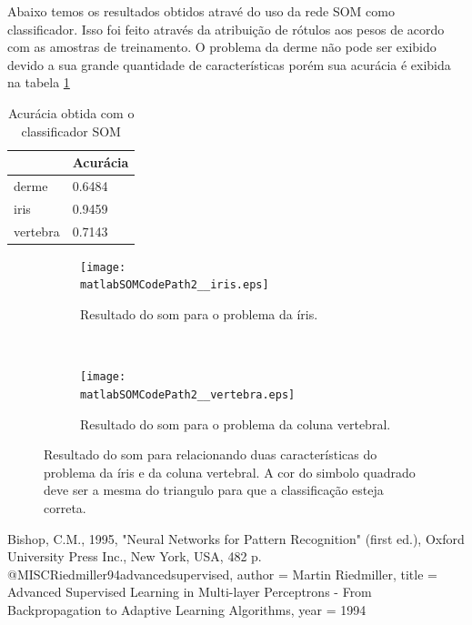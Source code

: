 \documentclass[
	article,			%
	11pt,				%
	oneside,			%
	a4paper,			%
	english,			%
	brazil,				%
	sumario=tradicional
	]{abntex2}
\newcommand{\matlabCodePath}{C:/Users/clifte/git/mestrado/Matlab/}
\newcommand{\matlabSOMCodePath}{\matlabCodePath Trabalho_RNA/trabalho2/SOM/}
\begin{document}
Abaixo temos os resultados obtidos atravé do uso da rede SOM como classificador.
Isso foi feito através da atribuição de rótulos aos pesos de acordo com as
amostras de treinamento. O problema da derme não pode ser exibido devido a sua
grande quantidade de características porém sua acurácia é exibida na tabela
\ref{tab:resSom}

\begin{table}[h]
\centering
\begin{tabular}{|l|l|}
\hline
         & Acurácia \\\hline
derme    & 0.6484   \\\hline
iris     & 0.9459   \\\hline
vertebra & 0.7143  \\\hline
\end{tabular}
\caption{Acurácia obtida com o classificador SOM}
\label{tab:resSom}
\end{table}



\begin{figure} 
	\centering
	\begin{subfigure}[b]{0.4\textwidth}
		\texttt{[image: \\matlabSOMCodePath2\_\_iris.eps]}
		\caption{Resultado do som para o problema da íris.}
	\end{subfigure}
    ~
    \begin{subfigure}[b]{0.4\textwidth}
		\texttt{[image: \\matlabSOMCodePath2\_\_vertebra.eps]}
		\caption{Resultado do som para o problema da coluna vertebral.}
	\end{subfigure}     
  \caption{Resultado do som para relacionando duas características do problema
  da íris e da coluna vertebral. A cor do simbolo quadrado deve ser a mesma do
  triangulo para que a classificação esteja correta.}
\end{figure}
% 


\begin{citacao}

\end{citacao}




Bishop, C.M., 1995, "Neural Networks for Pattern Recognition" (first ed.),
Oxford University Press Inc., New York, USA, 482 p.
 @MISC{Riedmiller94advancedsupervised,
    author = {Martin Riedmiller},
    title = {Advanced Supervised Learning in Multi-layer Perceptrons - From Backpropagation to Adaptive Learning Algorithms},
    year = {1994} 
}
\end{document}
